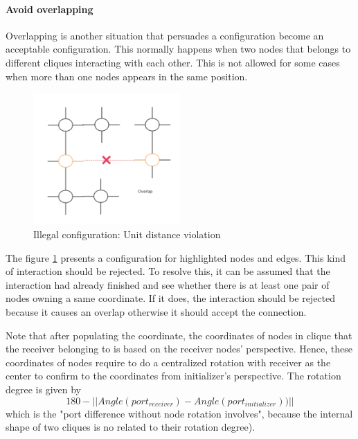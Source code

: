 \paragraph{Avoid overlapping}\noindent
Overlapping is another situation that persuades a configuration become an acceptable
configuration. This normally happens when two nodes that belongs to different cliques
interacting with each other. This is not allowed for some cases when more than one nodes
appears in the same position.
\begin{figure}[H]
\begin{center}
\includegraphics[width = 0.5\textwidth]{context/diagram/overlap.pdf}
\caption{Illegal configuration: Unit distance violation}
\label{overlap}
\end{center}
\end{figure}
\par\noindent
The figure \ref{overlap} presents a configuration for highlighted nodes and edges.
This kind of interaction should be rejected. To resolve this, it can be assumed that
the interaction had already finished and see whether there is at least one pair of nodes
owning a same coordinate. If it does, the interaction should be rejected because it causes
an overlap otherwise it should accept the connection.

\par\noindent
Note that after populating the coordinate, the coordinates of nodes in clique that the receiver belonging to
is based on the receiver nodes' perspective. Hence, these coordinates of nodes require to do a centralized rotation with receiver as the center to
confirm to the coordinates from initializer's perspective. The rotation degree is given by
$$180 - ||Angle(port_{receiver}) - Angle(port_{initializer}))||$$ which is the "port difference without node rotation involves", because the internal
shape of two cliques is no related to their rotation degree).

